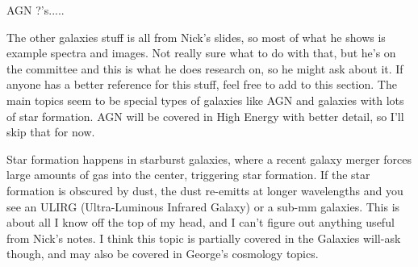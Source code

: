 AGN       ?'s.....

The other galaxies stuff is all from Nick's slides, so most of what he 
shows is example spectra and images.  Not really sure what to do with that, 
but he's on the committee and this is what he does research on, so he might 
ask about it.  If anyone has a better reference for this stuff, feel free 
to add to this section.  The main topics seem to be special types of galaxies 
like AGN and galaxies with lots of star formation.  AGN will be covered in High Energy with better detail, 
so I'll skip that for now.  

Star formation happens in starburst galaxies, where a recent galaxy merger 
forces large amounts of gas into the center, triggering star formation.  
If the star formation is obscured by dust, the dust re-emitts at longer 
wavelengths and you see an ULIRG (Ultra-Luminous Infrared Galaxy) or a sub-mm 
galaxies.  This is about all I know off the top of my head, and I can't figure 
out anything useful from Nick's notes.  I think this topic is partially covered 
in the Galaxies will-ask though, and may also be covered in George's cosmology 
topics.  
